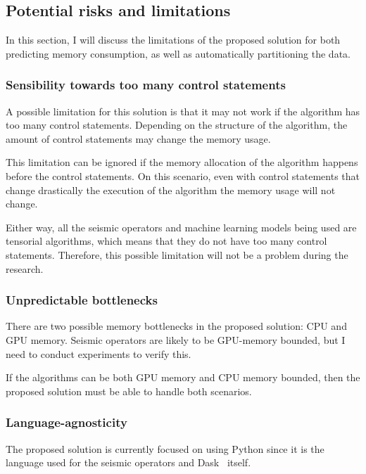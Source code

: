 \subsection{Potential risks and limitations}
\label{subsec:potential-risks-and-limitations}

In this section, I will discuss the limitations of the proposed solution for both predicting memory consumption, as well as automatically partitioning the data.

\subsubsection{Sensibility towards too many control statements}

A possible limitation for this solution is that it may not work if the algorithm has too many control statements.
Depending on the structure of the algorithm, the amount of control statements may change the memory usage.

This limitation can be ignored if the memory allocation of the algorithm happens before the control statements.
On this scenario, even with control statements that change drastically the execution of the algorithm the memory usage will not change.

Either way, all the seismic operators and machine learning models being used are tensorial algorithms, which means that they do not have too many control statements.
Therefore, this possible limitation will not be a problem during the research.

\subsubsection{Unpredictable bottlenecks}

There are two possible memory bottlenecks in the proposed solution: \ac{CPU} and \ac{GPU} memory.
Seismic operators are likely to be \ac{GPU}-memory bounded, but I need to conduct experiments to verify this.

If the algorithms can be both \ac{GPU} memory and \ac{CPU} memory bounded, then the proposed solution must be able to handle both scenarios.

\subsubsection{Language-agnosticity}

The proposed solution is currently focused on using Python since it is the language used for the seismic operators and Dask~\cite{dask} itself.

